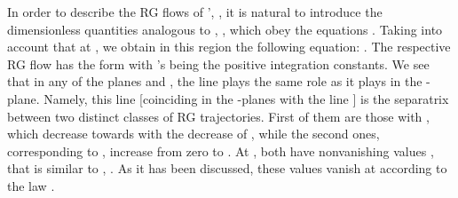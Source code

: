 \documentclass[a4paper,12pt]{article}
\begin{document}
In order to describe the RG flows of \coordHE{}', \coordHE{}, it is natural to introduce the dimensionless
quantities analogous to \coordHE{}, \coordHE{}, which obey the equations
\coordHE{}. Taking into account that \coordHE{} at \coordHE{},
we obtain in this region the following equation: \coordHE{}.
The respective RG flow has the form \coordHE{}
with \coordHE{}'s being the positive integration constants. We see that
in any of the planes \coordHE{} and
\coordHE{}, the line \coordHE{} plays the same role as it plays in the \coordHE{}-plane. Namely, this line [coinciding in the
\coordHE{}-planes with the
line \coordHE{}] is the separatrix
between two distinct classes of RG trajectories. First of them are
those with \coordHE{}, which decrease towards \coordHE{} with the
decrease of \coordHE{}, while the second ones, corresponding to \coordHE{}, increase from zero to
\coordHE{}. At \coordHE{}, both \coordHE{} have nonvanishing values \coordHE{}, that is similar to \coordHE{},
\coordHE{}. As it has been discussed, these values vanish
at \coordHE{} according to the law \coordHE{}.
\end{document}
